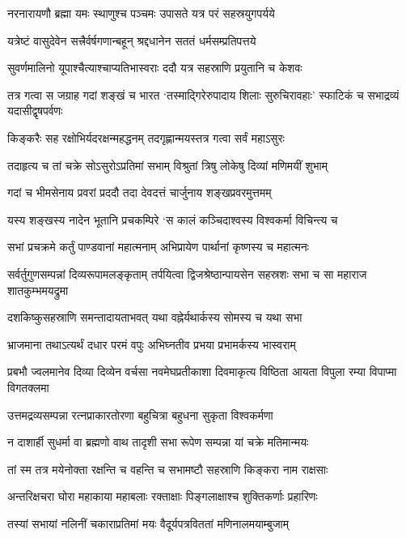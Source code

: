 \twolineshloka
{नरनारायणौ ब्रह्मा यमः स्थाणुश्च पञ्चमः}
{उपासते यत्र परं सहस्रयुगपर्यये}


\twolineshloka
{यत्रेष्टं वासुदेवेन सत्त्रैर्वर्षगणान्बहून्}
{श्रद्दधानेन सततं धर्मसम्प्रतिपत्तये}


\twolineshloka
{सुवर्णमालिनो यूपाश्चैत्याश्चाप्यतिभास्वराः}
{ददौ यत्र सहस्राणि प्रयुतानि च केशवः}


\threelineshloka
{तत्र गत्वा स जग्राह गदां शङ्खं च भारत}
{`तस्माद्गिरेरुपादाय शिलाः सुरुचिरावहाः'}
{स्फाटिकं च सभाद्रव्यं यदासीद्वृषपर्वणः}


\twolineshloka
{किङ्करैः सह रक्षोभिर्यदरक्षन्महद्धनम्}
{तदगृह्णान्मयस्तत्र गत्वा सर्वं महाऽसुरः}


\twolineshloka
{तदाहृत्य च तां चक्रे सोऽसुरोऽप्रतिमां सभाम्}
{विश्रुतां त्रिषु लोकेषु दिव्यां मणिमयीं शुभाम्}


\twolineshloka
{गदां च भीमसेनाय प्रवरां प्रददौ तदा}
{देवदत्तं चार्जुनाय शङ्खप्रवरमुत्तमम्}


\twolineshloka
{यस्य शङ्खस्य नादेन भूतानि प्रचकम्पिरे}
{`स कालं कञ्चिदाश्वस्य विश्वकर्मा विचिन्त्य च}


\twolineshloka
{सभां प्रचक्रमे कर्तुं पाण्डवानां महात्मनाम्}
{अभिप्रायेण पार्थानां कृष्णस्य च महात्मनः}


\threelineshloka
{सर्वर्तुगुणसम्पन्नां दिव्यरूपामलङ्कृताम्}
{तर्पयित्वा द्विजश्रेष्ठान्पायसेन सहस्रशः}
{सभा च सा महाराज शातकुम्भमयद्रुमा}


\twolineshloka
{दशकिष्कुसहस्राणि समन्तादायताभवत्}
{यथा वह्नेर्यथार्कस्य सोमस्य च यथा सभा}


\twolineshloka
{भ्राजमाना तथाऽत्यर्थं दधार परमं वपुः}
{अभिघ्नतीव प्रभया प्रभामर्कस्य भास्वराम्}


\threelineshloka
{प्रबभौ ज्वलमानेव दिव्या दिव्येन वर्चसा}
{नवमेघप्रतीकाशा दिवमाकृत्य विष्ठिता}
{आयता विपुला रम्या विपाप्मा विगतक्लमा}


\twolineshloka
{उत्तमद्रव्यसम्पन्ना रत्नप्राकारतोरणा}
{बहुचित्रा बहुधना सुकृता विश्वकर्मणा}


\twolineshloka
{न दाशार्ही सुधर्मा वा ब्रह्मणो वाथ तादृशी}
{सभा रूपेण सम्पन्ना यां चक्रे मतिमान्मयः}


\twolineshloka
{तां स्म तत्र मयेनोक्ता रक्षन्ति च वहन्ति च}
{सभामष्टौ सहस्राणि किङ्करा नाम राक्षसाः}


\twolineshloka
{अन्तरिक्षचरा घोरा महाकाया महाबलाः}
{रक्ताक्षाः पिङ्गलाक्षाश्च शुक्तिकर्णाः प्रहारिणः}


\twolineshloka
{तस्यां सभायां नलिनीं चकाराप्रतिमां मयः}
{वैदूर्यपत्रविततां मणिनालमयाम्बुजाम्}


